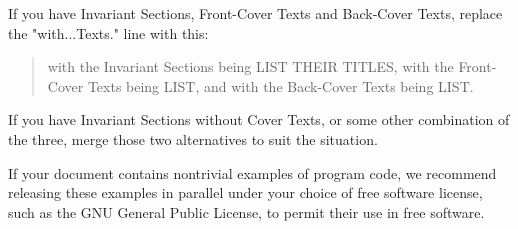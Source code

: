 If you have Invariant Sections, Front-Cover Texts and Back-Cover Texts,
replace the "with...Texts." line with this:

\bigskip
\begin{quote}
    with the Invariant Sections being LIST THEIR TITLES, with the
    Front-Cover Texts being LIST, and with the Back-Cover Texts being LIST.
\end{quote}
\bigskip
    
If you have Invariant Sections without Cover Texts, or some other
combination of the three, merge those two alternatives to suit the
situation.

If your document contains nontrivial examples of program code, we
recommend releasing these examples in parallel under your choice of
free software license, such as the GNU General Public License,
to permit their use in free software.

\widebaselines\par

%

\endinput
